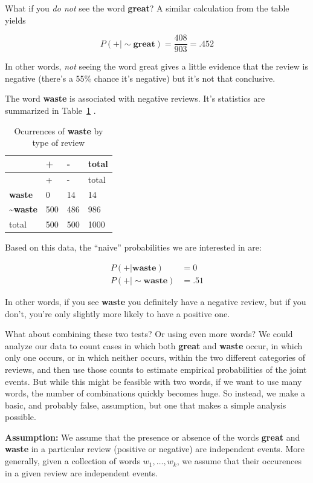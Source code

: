 \documentclass[
  11pt,
  letterpaper,
]{scrbook}
\theoremstyle{plain}
\theoremstyle{plain}
\theoremstyle{remark}
\begin{document}
What if you \emph{do not} see the word \textbf{great}? A similar
calculation from the table yields

\[
P(+|\sim\mathbf{great}) = \frac{408}{903} = .452
\]

In other words, \emph{not} seeing the word great gives a little evidence
that the review is negative (there's a 55\% chance it's negative) but
it's not that conclusive.

The word \textbf{waste} is associated with negative reviews. It's
statistics are summarized in Table~\ref{tbl-waste} .

\hypertarget{tbl-waste}{}
\begin{longtable}[]{@{}llll@{}}
\caption{\label{tbl-waste}Ocurrences of \textbf{waste} by type of
review}\tabularnewline
\toprule()
& + & - & total \\
\midrule()
\endfirsthead
\toprule()
& + & - & total \\
\midrule()
\endhead
\textbf{waste} & 0 & 14 & 14 \\
\textasciitilde{}\textbf{waste} & 500 & 486 & 986 \\
total & 500 & 500 & 1000 \\
\bottomrule()
\end{longtable}

Based on this data, the ``naive'' probabilities we are interested in
are:

\begin{align*}
P(+|\mathbf{waste}) &= 0\\
P(+|\sim\mathbf{waste}) &= .51
\end{align*}

In other words, if you see \textbf{waste} you definitely have a negative
review, but if you don't, you're only slightly more likely to have a
positive one.

What about combining these two tests? Or using even more words? We could
analyze our data to count cases in which both \textbf{great} and
\textbf{waste} occur, in which only one occurs, or in which neither
occurs, within the two different categories of reviews, and then use
those counts to estimate empirical probabilities of the joint events.
But while this might be feasible with two words, if we want to use many
words, the number of combinations quickly becomes huge. So instead, we
make a basic, and probably false, assumption, but one that makes a
simple analysis possible.

\textbf{Assumption:} We assume that the presence or absence of the words
\textbf{great} and \textbf{waste} in a particular review (positive or
negative) are independent events. More generally, given a collection of
words \(w_1,\ldots, w_k\), we assume that their occurences in a given
review are independent events.
\end{document}

